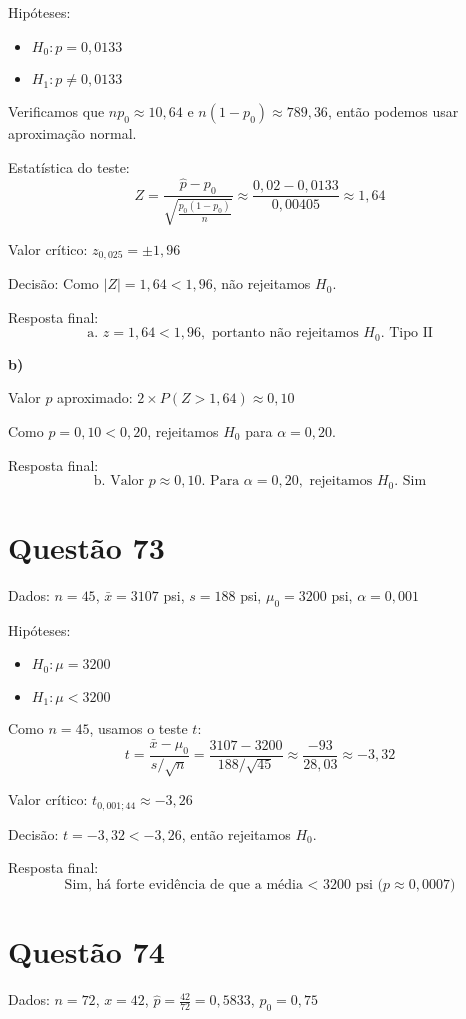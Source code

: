 \documentclass[12pt]{article}
\newcommand{\quest}[1]{\section*{Questão #1}} %
\begin{document}
Hipóteses:
\begin{itemize}
  \item $H_0: p = 0{,}0133$
  \item $H_1: p \neq 0{,}0133$
\end{itemize}

Verificamos que $np_0 \approx 10{,}64$ e $n(1 - p_0) \approx 789{,}36$, então podemos usar aproximação normal.

Estatística do teste:
\[
Z = \frac{\hat{p} - p_0}{\sqrt{\frac{p_0(1 - p_0)}{n}}} \approx \frac{0{,}02 - 0{,}0133}{0{,}00405} \approx 1{,}64
\]

Valor crítico: $z_{0{,}025} = \pm 1{,}96$

Decisão: Como $|Z| = 1{,}64 < 1{,}96$, não rejeitamos $H_0$.

Resposta final:
\[
\boxed{\text{a. } z = 1{,}64 < 1{,}96, \text{ portanto não rejeitamos } H_0. \text{ Tipo II}}
\]

\textbf{b)}

Valor $p$ aproximado: $2 \times P(Z > 1{,}64) \approx 0{,}10$

Como $p = 0{,}10 < 0{,}20$, rejeitamos $H_0$ para $\alpha = 0{,}20$.

Resposta final:
\[
\boxed{\text{b. Valor } p \approx 0{,}10. \text{ Para } \alpha = 0{,}20, \text{ rejeitamos } H_0. \text{ Sim}}
\]

\quest{73}

Dados: $n = 45$, $\bar{x} = 3107$ psi, $s = 188$ psi, $\mu_0 = 3200$ psi, $\alpha = 0{,}001$

Hipóteses:
\begin{itemize}
  \item $H_0: \mu = 3200$
  \item $H_1: \mu < 3200$
\end{itemize}

Como $n = 45$, usamos o teste $t$:
\[
t = \frac{\bar{x} - \mu_0}{s / \sqrt{n}} = \frac{3107 - 3200}{188 / \sqrt{45}} \approx \frac{-93}{28{,}03} \approx -3{,}32
\]

Valor crítico: $t_{0{,}001; 44} \approx -3{,}26$

Decisão: $t = -3{,}32 < -3{,}26$, então rejeitamos $H_0$.

Resposta final:
\[
\boxed{\text{Sim, h\'a forte evid\^encia de que a m\'edia < 3200 psi ($p \approx 0{,}0007$)}}
\]

\quest{74}

Dados: $n = 72$, $x = 42$, $\hat{p} = \frac{42}{72} = 0{,}5833$, $p_0 = 0{,}75$
\end{document}
